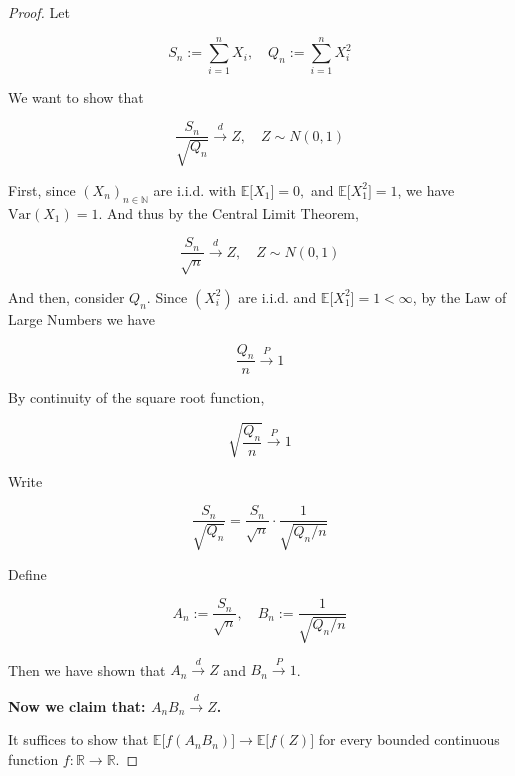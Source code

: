 \begin{proof}

Let

\[\mathit{S}_{\mathit{n}} := \sum\limits_{\mathit{i} = 1}^{\mathit{n}}\mathit{X}_{\mathit{i}},\quad\mathit{Q}_{\mathit{n}} := \sum\limits_{\mathit{i} = 1}^{\mathit{n}}\mathit{X}_{\mathit{i}}^{2}\]

We want to show that

\[\frac{\mathit{S}_{\mathit{n}}}{\sqrt{\mathit{Q}_{\mathit{n}}}}\overset{\mathit{d}}{\rightarrow}\mathit{Z},\quad\mathit{Z} \sim \mathit{N}(0,1)\]

First, since \((\mathit{X}_{\mathit{n}})_{\mathit{n} \in \mathbb{N}}\) are i.i.d. with \(\mathbb{E}\lbrack\mathit{X}_{1}\rbrack = 0,\) and \(\mathbb{E}\lbrack\mathit{X}_{1}^{2}\rbrack = 1\), we have \(\text{Var}(\mathit{X}_{1}) = 1\). And thus by the Central Limit Theorem,

\[\frac{\mathit{S}_{\mathit{n}}}{\sqrt{\mathit{n}}}\overset{\mathit{d}}{\rightarrow}\mathit{Z},\quad\mathit{Z} \sim \mathit{N}(0,1)\]

And then, consider \(\mathit{Q}_{\mathit{n}}\). Since \((\mathit{X}_{\mathit{i}}^{2})\) are i.i.d. and \(\mathbb{E}\lbrack\mathit{X}_{1}^{2}\rbrack = 1 < \infty\), by the Law of Large Numbers we have

\[\frac{\mathit{Q}_{\mathit{n}}}{\mathit{n}}\overset{\mathit{P}}{\rightarrow}1\]

By continuity of the square root function,

\[\sqrt{\frac{\mathit{Q}_{\mathit{n}}}{\mathit{n}}}\overset{\mathit{P}}{\rightarrow}1\]

Write

\[\frac{\mathit{S}_{\mathit{n}}}{\sqrt{\mathit{Q}_{\mathit{n}}}} = \frac{\mathit{S}_{\mathit{n}}}{\sqrt{\mathit{n}}} \cdot \frac{1}{\sqrt{\mathit{Q}_{\mathit{n}}/\mathit{n}}}\]

Define

\[\mathit{A}_{\mathit{n}} := \frac{\mathit{S}_{\mathit{n}}}{\sqrt{\mathit{n}}},\quad\mathit{B}_{\mathit{n}} := \frac{1}{\sqrt{\mathit{Q}_{\mathit{n}}/\mathit{n}}}\]

Then we have shown that \(\mathit{A}_{\mathit{n}}\overset{\mathit{d}}{\rightarrow}\mathit{Z}\) and \(\mathit{B}_{\mathit{n}}\overset{\mathit{P}}{\rightarrow}1\).

\textbf{Now we claim that: \(\mathit{A}_{\mathit{n}}\mathit{B}_{\mathit{n}}\overset{\mathit{d}}{\rightarrow}\mathit{Z}\).}

It suffices to show that \(\mathbb{E}\lbrack\mathit{f}(\mathit{A}_{\mathit{n}}\mathit{B}_{\mathit{n}})\rbrack\rightarrow\mathbb{E}\lbrack\mathit{f}(\mathit{Z})\rbrack\) for every bounded continuous function \(\mathit{f}:\mathbb{R}\rightarrow\mathbb{R}\).


\end{proof}

